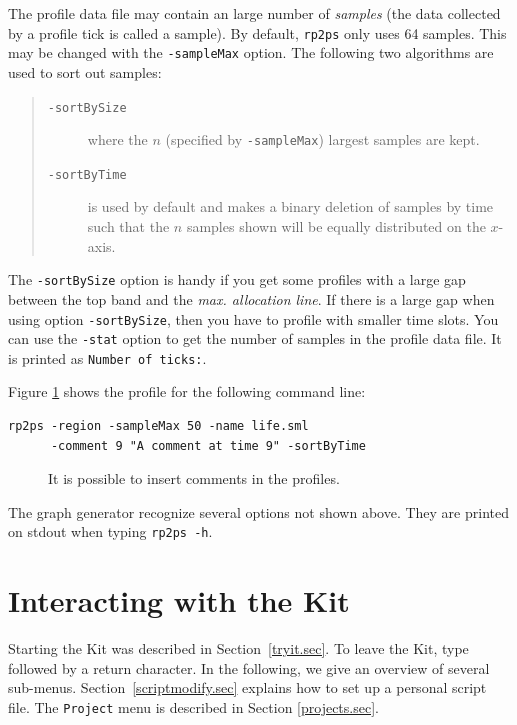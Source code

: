 \documentclass[12pt]{book}
\begin{document}
The profile data file may contain an large number of \emph{samples}
(the data collected by a profile tick is called a sample). By default,
\texttt{rp2ps} only uses 64 samples. This may be changed with the
\texttt{-sampleMax} option. The following two algorithms are used to sort
out samples:
\begin{quote}
\begin{description}
\item[{\tt -sortBySize}] where the $n$ (specified by \texttt{-sampleMax})
  largest samples are kept.
\item[{\tt -sortByTime}] is used by default and makes a binary deletion of
  samples by time such that the $n$ samples shown will be equally
  distributed on the $x$-axis.
\end{description}
\end{quote}
\noindent
The \texttt{-sortBySize} option is handy if you get some profiles
with a large gap between the top band and the \emph{max. allocation line}.
If there is a large gap when using option \texttt{-sortBySize}, then you
have to profile with smaller time slots. You can use the 
\texttt{-stat}
option to get the number of samples in the profile data file. It is printed
as \texttt{Number of ticks:}.

Figure \ref{prof_eks4.fig} shows the profile for the following
command line:
\begin{verbatim}
rp2ps -region -sampleMax 50 -name life.sml 
      -comment 9 "A comment at time 9" -sortByTime
\end{verbatim}
\noindent

\begin{figure}[htb]
\begin{center}
  \caption{It is possible to insert comments in the profiles.}\label{prof_eks4.fig}
\end{center}
\end{figure}
The graph generator recognize several options not shown above. They are
printed on stdout when typing \texttt{rp2ps -h}.
%
\chapter{Interacting with the Kit}
%
\label{controlkit.sec}
\label{startup.sec}
Starting the Kit was described in Section~\ref{tryit.sec}.  To
leave the Kit, type  followed by a
return character.  In the following, we give an overview of several
sub-menus.  Section~\ref{scriptmodify.sec} explains how to set up a
personal script file. The {\tt Project} menu is described in Section
\ref{projects.sec}.
\end{document}
